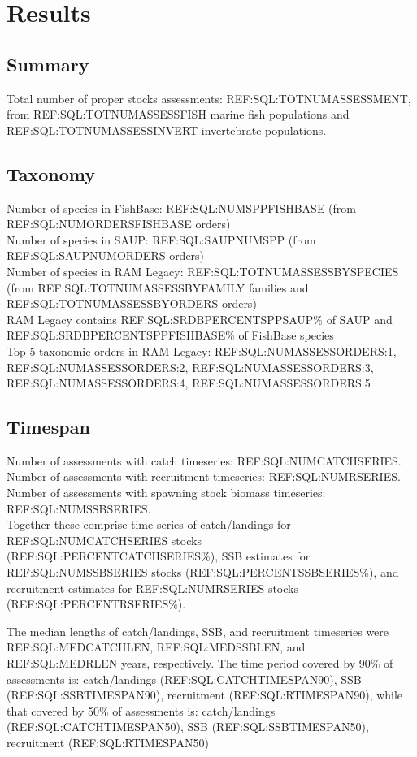 \section*{Results}
\subsection*{Summary}
\noindent
Total number of proper stocks assessments: REF:SQL:TOTNUMASSESSMENT, from REF:SQL:TOTNUMASSESSFISH marine fish populations and REF:SQL:TOTNUMASSESSINVERT
invertebrate populations.

\subsection*{Taxonomy}
\noindent

Number of species in FishBase: REF:SQL:NUMSPPFISHBASE (from REF:SQL:NUMORDERSFISHBASE orders) \\
Number of species in SAUP: REF:SQL:SAUPNUMSPP (from REF:SQL:SAUPNUMORDERS orders)\\
Number of species in RAM Legacy: REF:SQL:TOTNUMASSESSBYSPECIES (from REF:SQL:TOTNUMASSESSBYFAMILY families and REF:SQL:TOTNUMASSESSBYORDERS orders) \\
RAM Legacy contains REF:SQL:SRDBPERCENTSPPSAUP\% of SAUP and REF:SQL:SRDBPERCENTSPPFISHBASE\% of FishBase species\\
Top 5 taxonomic orders in RAM Legacy: REF:SQL:NUMASSESSORDERS:1, REF:SQL:NUMASSESSORDERS:2, REF:SQL:NUMASSESSORDERS:3, REF:SQL:NUMASSESSORDERS:4, REF:SQL:NUMASSESSORDERS:5 \\

\subsection*{Timespan}
\noindent
Number of assessments with catch timeseries: REF:SQL:NUMCATCHSERIES.\\
Number of assessments with recruitment timeseries: REF:SQL:NUMRSERIES.\\
Number of assessments with spawning stock biomass timeseries: REF:SQL:NUMSSBSERIES.\\

Together these comprise time series of
catch/landings for REF:SQL:NUMCATCHSERIES stocks (REF:SQL:PERCENTCATCHSERIES\%),
SSB estimates for REF:SQL:NUMSSBSERIES stocks (REF:SQL:PERCENTSSBSERIES\%), and recruitment estimates for
REF:SQL:NUMRSERIES stocks (REF:SQL:PERCENTRSERIES\%).

The median lengths of catch/landings, SSB, and recruitment timeseries
were REF:SQL:MEDCATCHLEN, REF:SQL:MEDSSBLEN, and REF:SQL:MEDRLEN
years, respectively.  The time period covered by 90\% of assessments
is: catch/landings (REF:SQL:CATCHTIMESPAN90), SSB
(REF:SQL:SSBTIMESPAN90), recruitment (REF:SQL:RTIMESPAN90), while that
covered by 50\% of assessments is: catch/landings
(REF:SQL:CATCHTIMESPAN50), SSB (REF:SQL:SSBTIMESPAN50), recruitment
(REF:SQL:RTIMESPAN50)
 
